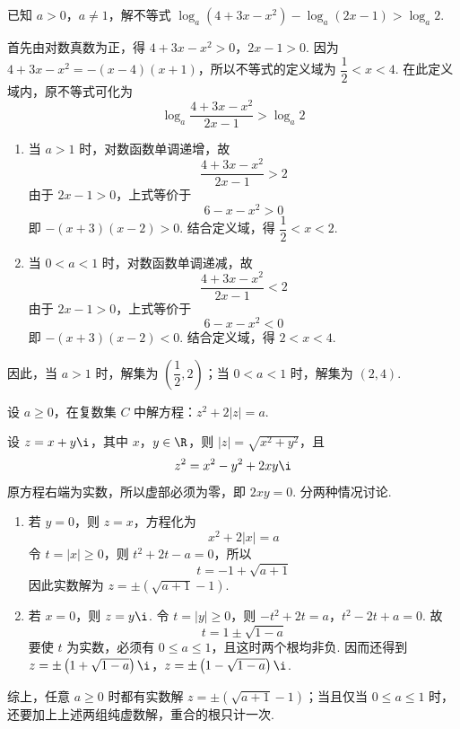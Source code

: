 \documentclass[UTF8,a4paper,oneside,11pt]{ctexbook}
\begin{document}
\begin{problem}
已知 \(a>0\)，\(a\neq 1\)，解不等式 \(\log_a\left( 4+3x-x^2 \right)-\log_a\left( 2x-1 \right)>\log_a 2\).
\end{problem}

\begin{solution}
首先由对数真数为正，得
\(4+3x-x^2>0\)，\(2x-1>0\).
因为 \(4+3x-x^2=-(x-4)(x+1)\)，所以不等式的定义域为 \(\dfrac{1}{2}<x<4\). 在此定义域内，原不等式可化为
\[
\log_a\frac{4+3x-x^2}{2x-1}>\log_a2
\]
\begin{enumerate}
\item 当 \(a>1\) 时，对数函数单调递增，故
\[
\frac{4+3x-x^2}{2x-1}>2
\]
由于 \(2x-1>0\)，上式等价于
\[
6-x-x^2>0
\]
即 \(-(x+3)(x-2)>0\). 结合定义域，得 \(\dfrac{1}{2}<x<2\).

\item 当 \(0<a<1\) 时，对数函数单调递减，故
\[
\frac{4+3x-x^2}{2x-1}<2
\]
由于 \(2x-1>0\)，上式等价于
\[
6-x-x^2<0
\]
即 \(-(x+3)(x-2)<0\). 结合定义域，得 \(2<x<4\).
\end{enumerate}
因此，当 \(a>1\) 时，解集为 \(\left(\dfrac{1}{2},2\right)\)；当 \(0<a<1\) 时，解集为 \((2,4)\).
\end{solution}

\begin{problem}
设 \(a\geqslant 0\)，在复数集 \(C\) 中解方程：\(z^2+2\left| z \right|=a\).
\end{problem}

\begin{solution}
设 \(z=x+y\i\)，其中 \(x\)，\(y\in\R\)，则 \(|z|=\sqrt{x^2+y^2}\)，且
\[
z^2=x^2-y^2+2xy\i
\]
原方程右端为实数，所以虚部必须为零，即 \(2xy=0\). 分两种情况讨论.
\begin{enumerate}
\item 若 \(y=0\)，则 \(z=x\)，方程化为
\[
x^2+2|x|=a
\]
令 \(t=|x|\geqslant0\)，则 \(t^2+2t-a=0\)，所以
\[
t=-1+\sqrt{a+1}
\]
因此实数解为 \(z=\pm\left(\sqrt{a+1}-1\right)\).

\item 若 \(x=0\)，则 \(z=y\i\). 令 \(t=|y|\geqslant0\)，则
\(-t^2+2t=a\)，\(t^2-2t+a=0\).
故
\[
t=1\pm\sqrt{1-a}
\]
要使 \(t\) 为实数，必须有 \(0\leqslant a\leqslant1\)，且这时两个根均非负. 因而还得到
\(z=\pm\left(1+\sqrt{1-a}\right)\i\)，\(z=\pm\left(1-\sqrt{1-a}\right)\i\).
\end{enumerate}
综上，任意 \(a\geqslant0\) 时都有实数解 \(z=\pm\left(\sqrt{a+1}-1\right)\)；当且仅当 \(0\leqslant a\leqslant1\) 时，还要加上上述两组纯虚数解，重合的根只计一次.
\end{solution}
\end{document}
